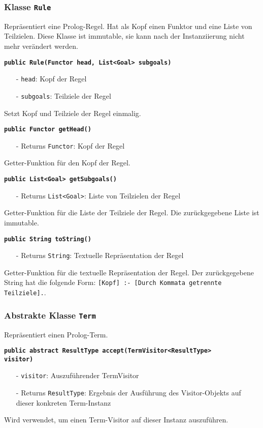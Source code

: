 \documentclass[parskip=full,11pt,twoside]{scrartcl}
\begin{document}
\subsubsection{Klasse \texttt{Rule}}
Repräsentiert eine Prolog-Regel. Hat als Kopf einen Funktor und eine Liste von Teilzielen. Diese Klasse ist immutable, sie kann nach der Instanziierung nicht mehr verändert werden.

\textbf{\texttt{public Rule(Functor head, List<Goal> subgoals)}}
\begin{itemize}[noitemsep]
	\item[-] \texttt{head}: Kopf der Regel
	\item[-] \texttt{subgoals}: Teilziele der Regel
\end{itemize}
Setzt Kopf und Teilziele der Regel einmalig.

\textbf{\texttt{public Functor getHead()}}
\begin{itemize}[noitemsep]
	\item[-] Returns \texttt{Functor}: Kopf der Regel
\end{itemize}
Getter-Funktion für den Kopf der Regel.

\textbf{\texttt{public List<Goal> getSubgoals()}}
\begin{itemize}[noitemsep]
	\item[-] Returns \texttt{List<Goal>}: Liste von Teilzielen der Regel
\end{itemize}
Getter-Funktion für die Liste der Teilziele der Regel. Die zurückgegebene Liste ist immutable.

\textbf{\texttt{public String toString()}}
\begin{itemize}[noitemsep]
	\item[-] Returns \texttt{String}: Textuelle Repräsentation der Regel
\end{itemize}
Getter-Funktion für die textuelle Repräsentation der Regel. Der zurückgegebene String hat die folgende Form: \texttt{[Kopf] :- [Durch Kommata getrennte Teilziele].}.
\subsubsection{Abstrakte Klasse \texttt{Term}}
Repräsentiert einen Prolog-Term.

\textbf{\texttt{public abstract ResultType accept(TermVisitor<ResultType>\\visitor)}}
\begin{itemize}[noitemsep]
	\item[-] \texttt{visitor}: Auszuführender TermVisitor
	\item[-] Returns \texttt{ResultType}: Ergebnis der Ausführung des Visitor-Objekts auf dieser konkreten Term-Instanz
\end{itemize}
Wird verwendet, um einen Term-Visitor auf dieser Instanz auszuführen.
\end{document}
